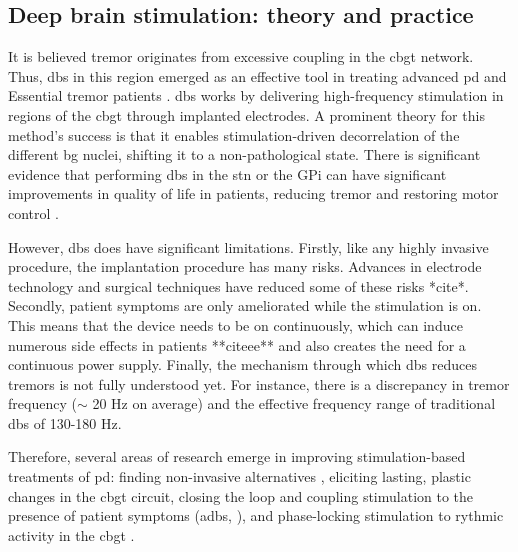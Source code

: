 \subsection{Deep brain stimulation: theory and practice}
It is believed tremor originates from excessive coupling in the \acrshort{cbgt} network.
Thus, \acrshort{dbs} in this region emerged as an effective tool in treating advanced \acrshort{pd} and Essential tremor
patients \cite{del2018advances}.
\acrshort{dbs} works by delivering high-frequency stimulation in regions of the \acrshort{cbgt}
through implanted electrodes.
A prominent theory for this method's success is that it enables stimulation-driven
decorrelation of the different \acrshort{bg} nuclei, shifting it to a non-pathological state.
There is significant evidence that performing \acrshort{dbs} in the \acrshort{stn} or the GPi can have significant improvements in
quality of life in patients, reducing tremor and restoring motor control
\cite{rodriguez2005bilateral, rubin2004high}.

However, \acrshort{dbs} does have significant limitations. Firstly, like any highly invasive procedure, the implantation procedure has many risks.
Advances in electrode technology and surgical techniques have reduced some of these risks *cite*.
Secondly, patient symptoms are only ameliorated while the stimulation is on. This means that
the device needs to be on continuously, which can induce numerous side effects in patients
**citeee** and also creates the need for a continuous power supply.
Finally, the mechanism through which \acrshort{dbs} reduces tremors is not fully understood yet.
For instance, there is a discrepancy in tremor frequency ($\sim$ 20 Hz on average) and the effective frequency range of
traditional \acrshort{dbs} of 130-180 Hz.

Therefore, several areas of research emerge in improving stimulation-based treatments of \acrshort{pd}:
finding non-invasive alternatives \cite{saturnino2017target, schwab2020spike}, eliciting lasting,
plastic changes in the \acrshort{cbgt} circuit, closing the loop and coupling stimulation to the presence of
patient symptoms (\acrfull{adbs}, \cite{beudel2018adaptive}), and phase-locking stimulation to
rythmic activity in the \acrshort{cbgt} \cite{cagnan2017stimulating, west2022stimulating}.

